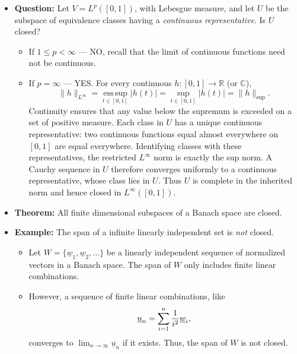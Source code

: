\documentclass[11pt,twoside]{report}
\newcommand{\vecnot}{\underline}
\begin{document}
\begin{itemize}
\item \textbf{Question: } Let $V=L^p([0,1])$, with Lebesgue measure, and let $U$ be the subspace of equivalence classes having a \emph{continuous representative}.  Is $U$ closed?
\begin{itemize}
\item  If $1 \le p < \infty$ --- NO, recall that the limit of continuous functions need not be continuous. 
\item If $p = \infty$ --- YES.  For every continuous $h\colon[0,1]\to\mathbb{R}$ (or $\mathbb{C}$),
\[
\|h\|_{L^\infty}=\operatorname*{ess\,sup}_{t\in[0,1]}|h(t)|
=\sup_{t\in[0,1]}|h(t)|=\|h\|_{\mathrm{sup}}.
\]
Continuity ensures that any value below the supremum is exceeded on a set of positive measure.  Each class in $U$ has a unique continuous representative: two continuous functions equal almost everywhere on $[0,1]$ are equal everywhere.  Identifying classes with these representatives, the restricted $L^\infty$ norm is exactly the sup norm.  A Cauchy sequence in $U$ therefore converges uniformly to a continuous representative, whose class lies in $U$.  Thus $U$ is complete in the inherited norm and hence closed in $L^\infty([0,1])$.
\end{itemize}



\item \textbf{Theorem:}  All finite dimensional subspaces of a Banach space are closed.


\item \textbf{Example:} The span of a infinite linearly independent set is \emph{not} closed. 
\begin{itemize}
\item Let $W = \{\vecnot{w}_1 ,\vecnot{w}_2 , \ldots \}$ be a linearly independent sequence of normalized vectors in a Banach space.
The span of $W$ only includes finite linear combinations.
\item However, a sequence of finite linear combinations, like \vspace{-2mm}
\[ \vecnot{u}_n = \sum_{i=1}^n \frac{1}{i^2} \vecnot{w}_i , \vspace{-1.5mm} \]  converges to $\lim_{n\to \infty} \vecnot{u}_n$ if it exists. Thus, the span of $W$ is not closed.
\end{itemize}

\end{itemize}
\end{document}
